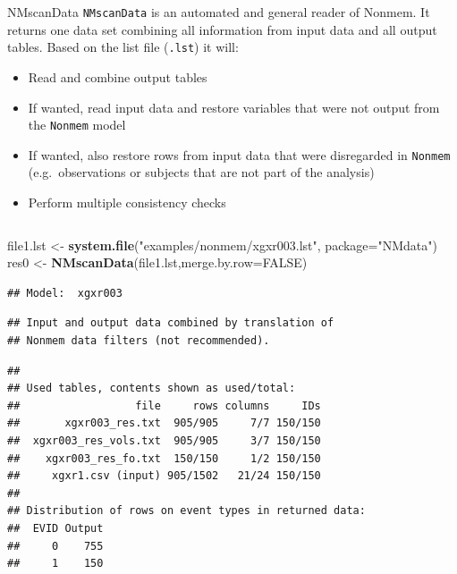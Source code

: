 \documentclass[
  8pt,
  ignorenonframetext,
  aspectratio=169]{beamer}
\newenvironment{Shaded}{\begin{snugshade}}{\end{snugshade}}
\newcommand{\DataTypeTok}[1]{\textcolor[rgb]{0.13,0.29,0.53}{#1}}
\newcommand{\KeywordTok}[1]{\textcolor[rgb]{0.13,0.29,0.53}{\textbf{#1}}}
\newcommand{\NormalTok}[1]{#1}
\newcommand{\OtherTok}[1]{\textcolor[rgb]{0.56,0.35,0.01}{#1}}
\newcommand{\StringTok}[1]{\textcolor[rgb]{0.31,0.60,0.02}{#1}}
\providecommand{\tightlist}{%
  \setlength{\itemsep}{0pt}\setlength{\parskip}{0pt}}
\begin{document}
\begin{frame}[fragile]{NMscanData}
\protect\hypertarget{nmscandata}{}
\texttt{NMscanData} is an automated and general reader of Nonmem. It
returns one data set combining all information from input data and all
output tables. Based on the list file (\texttt{.lst}) it will:

\begin{itemize}
\tightlist
\item
  Read and combine output tables
\item
  If wanted, read input data and restore variables that were not output
  from the \texttt{Nonmem} model
\item
  If wanted, also restore rows from input data that were disregarded in
  \texttt{Nonmem} (e.g.~observations or subjects that are not part of
  the analysis)
\item
  Perform multiple consistency checks
\end{itemize}

\pause
\footnotesize

\begin{columns}[T]
\begin{column}{0.48\textwidth}
\begin{Shaded}
\begin{Highlighting}[]
\NormalTok{file1.lst \textless{}{-}}\StringTok{ }\KeywordTok{system.file}\NormalTok{(}\StringTok{"examples/nonmem/xgxr003.lst"}\NormalTok{,}
                         \DataTypeTok{package=}\StringTok{"NMdata"}\NormalTok{)}
\NormalTok{res0 \textless{}{-}}\StringTok{ }\KeywordTok{NMscanData}\NormalTok{(file1.lst,}\DataTypeTok{merge.by.row=}\OtherTok{FALSE}\NormalTok{)}
\end{Highlighting}
\end{Shaded}

\begin{verbatim}
## Model:  xgxr003
\end{verbatim}

\begin{verbatim}
## Input and output data combined by translation of
## Nonmem data filters (not recommended).
\end{verbatim}

\begin{verbatim}
## 
## Used tables, contents shown as used/total:
##                  file     rows columns     IDs
##       xgxr003_res.txt  905/905     7/7 150/150
##  xgxr003_res_vols.txt  905/905     3/7 150/150
##    xgxr003_res_fo.txt  150/150     1/2 150/150
##     xgxr1.csv (input) 905/1502   21/24 150/150
## 
## Distribution of rows on event types in returned data:
##  EVID Output
##     0    755
##     1    150
\end{verbatim}
\end{column}


\end{columns}
\end{frame}
\end{document}
